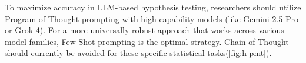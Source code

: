 \documentclass{article}
\begin{document}
To maximize accuracy in LLM-based hypothesis testing, researchers should utilize Program of Thought prompting with high-capability models (like Gemini 2.5 Pro or Grok-4). For a more universally robust approach that works across various model families, Few-Shot prompting is the optimal strategy. Chain of Thought should currently be avoided for these specific statistical tasks(\ref{fig:h-pmt}).
\end{document}

